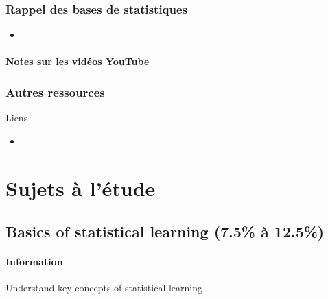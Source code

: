 \documentclass[12pt, titlepage, french]{report}
\begin{document}
\section{Rappel des bases de statistiques}

\begin{YTB_vids}
\begin{itemize}
	\item	
\end{itemize}
\end{YTB_vids}

\subsection{Notes sur les vidéos YouTube}

%

\clearpage

\section{Autres ressources}
\begin{FORMULA_SUMM}{Liens}
\begin{itemize}
	\item	
\end{itemize}
\end{FORMULA_SUMM}

\part*{Sujets à l'étude}

\chapter[Basics of statistical learning]{Basics of statistical learning (7.5\% à 12.5\%)}

\subsection{Information}

\begin{distributions}[Objective]
Understand key concepts of statistical learning
\end{distributions}
\end{document}
